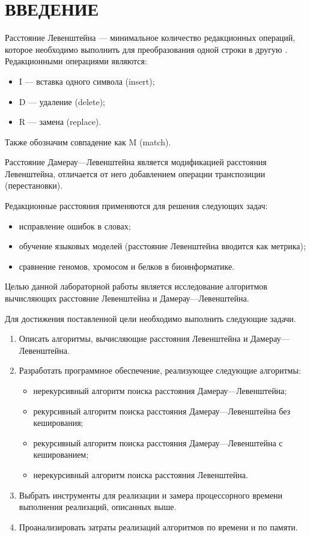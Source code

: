 \chapter*{ВВЕДЕНИЕ}

Расстояние Левенштейна --- минимальное количество редакционных операций, которое необходимо выполнить для преобразования одной строки в другую \cite{levenshtein}. Редакционными операциями являются: 
\begin{itemize}
	\item I --- вставка одного символа (insert);
	\item D --- удаление (delete);
	\item R --- замена (replace).
\end{itemize}
Также обозначим совпадение как M (match).

Расстояние Дамерау---Левенштейна является модификацией расстояния Левенштейна, отличается от него добавлением операции транспозиции (перестановки).  

Редакционные расстояния применяются для решения следующих задач:
\begin{itemize}
	\item исправление ошибок в словах;
	\item обучение языковых моделей (расстояние Левенштейна вводится как метрика);
	\item сравнение геномов, хромосом и белков в биоинформатике.
\end{itemize}

Целью данной лабораторной работы является исследование алгоритмов вычисляющих расстояние Левенштейна и Дамерау---Левенштейна.

Для достижения поставленной цели необходимо выполнить следующие задачи.
\begin{enumerate}
	\item Описать алгоритмы, вычисляющие расстояния Левенштейна и Дамерау---Левенштейна.
	\item Разработать программное обеспечение, реализующее следующие алгоритмы:
	\begin{itemize}
		\item нерекурсивный алгоритм поиска расстояния Дамерау---Левенштейна;
		\item рекурсивный алгоритм поиска расстояния Дамерау---Левенштейна без кеширования;
		\item рекурсивный алгоритм поиска расстояния Дамерау---Левенштейна с кешированием;
		\item нерекурсивный алгоритм поиска расстояния Левенштейна.
	\end{itemize}
	\item Выбрать инструменты для реализации и замера процессорного времени выполнения реализаций, описанных выше.
	\item Проанализировать затраты реализаций алгоритмов по времени и по памяти.
\end{enumerate}

